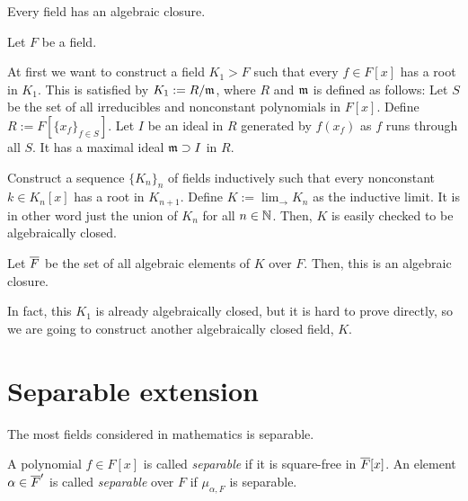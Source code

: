 \documentclass{../exp}
\begin{document}
\begin{thm}
Every field has an algebraic closure.
\end{thm}
\begin{pf}
Let $F$ be a field.

At first we want to construct a field $K_1>F$ such that every $f\in F[x]$ has a root in $K_1$.
This is satisfied by $K_1:=R/\mathfrak{m}$, where $R$ and $\mathfrak{m}$ is defined as follows:
Let $S$ be the set of all irreducibles and nonconstant polynomials in $F[x]$.
Define $R:=F[\{x_f\}_{f\in S}]$.
Let $I$ be an ideal in $R$ generated by $f(x_f)$ as $f$ runs through all $S$.
It has a maximal ideal $\mathfrak{m}\supset I$ in $R$.

Construct a sequence $\{K_n\}_n$ of fields inductively such that every nonconstant $k\in K_n[x]$ has a root in $K_{n+1}$.
Define $K:=\lim_{\to}K_n$ as the inductive limit.
It is in other word just the union of $K_n$ for all $n\in\mathbb{N}$.
Then, $K$ is easily checked to be algebraically closed.

Let $\overline F$ be the set of all algebraic elements of $K$ over $F$.
Then, this is an algebraic closure.
\end{pf}
\begin{rmk}
In fact, this $K_1$ is already algebraically closed, but it is hard to prove directly, so we are going to construct another algebraically closed field, $K$.
\end{rmk}






























\section{Separable extension}

The most fields considered in mathematics is separable.

\begin{defn}
A polynomial $f\in F[x]$ is called \emph{separable} if it is square-free in $\overline F[x]$.
An element $\alpha\in\overline F'$ is called \emph{separable} over $F$ if $\mu_{\alpha,F}$ is separable.
\end{defn}
\end{document}
